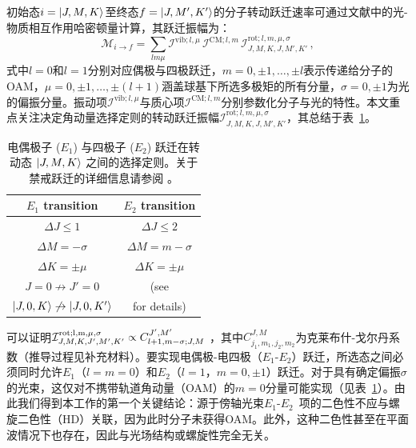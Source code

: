 \documentclass[reprint,aps,prl,twocolumn,superscriptaddress,groupedaddress]{revtex4-2}
\newcommand{\eoet}{$E_1$-$E_2$}
\begin{document}
\begin{CJK*}{UTF8}{gbsn}
初始态$i=\ket{J,M,K}$至终态$f=\ket{J,M',K'}$的分子转动跃迁速率可通过文献\cite{Maslov2024,Maslov_Thesis}中的光-物质相互作用哈密顿量计算，其跃迁振幅为：
\begin{equation}
    \mathcal{M}_{i\to f}=\sum_{lm\mu}\mathcal{I}^{\text{vib}; l,\mu}\,\mathcal{I}^{\text{CM}; l,m}\,\mathcal{I}^{\text{rot}; l,m,\mu,\sigma}_{J,M,K,J,M',K'}\,,
    \label{eq_transition_matrix}
\end{equation}
式中$l=0$和$l=1$分别对应偶极与四极跃迁，$m = 0, \pm 1, \dots, \pm l$表示传递给分子的OAM，$\mu = 0, \pm 1, \dots, \pm (l+1)$涵盖球基下所选多极矩的所有分量，$\sigma =0, \pm 1$为光的偏振分量。振动项$\mathcal{I}^{\text{vib}; l,\mu}$与质心项$\mathcal{I}^{\text{CM}; l,m}$分别参数化分子与光的特性。本文重点关注决定角动量选择定则的转动跃迁振幅$\mathcal{I}^{\text{rot};l,m,\mu,\sigma}_{J,M,K,J,M',K'}$，其总结于表~\ref{SelectionRules}。
\begin{table}[ht!]
    \centering
    \begin{tabular}{c c}\hline
    \toprule
        \textbf{$E_1$ transition} & \textbf{$E_2$ transition}  \\
        \midrule
        $\Delta J\leq 1$ &  $\Delta J\leq 2$ \\
        $\Delta M=-\sigma$ & $\Delta M=m-\sigma$ \\
        $\Delta K=\pm\mu$ & $\Delta K=\pm\mu$ \\
        $J=0\not\to J'=0$ &  (see \cite{Note1}\\
        $\ket{J,0,K}\not\to\ket{J,0,K'}$ &  for details)\\
    \bottomrule
\hline
    \end{tabular}
    \caption{电偶极子 ($E_1$) 与四极子 ($E_2$) 跃迁在转动态 $\ket{J,M,K}$ 之间的选择定则。关于禁戒跃迁的详细信息请参阅 \cite{Note1}。}
    \label{SelectionRules}
\end{table}
可以证明$\mathcal{I}^{\rm rot; l, m, \mu, \sigma}_{J, M, K, J', M', K'} \propto C^{J',M'}_{l+1, m-\sigma; J, M}$ \cite{Maslov2024,Maslov_Thesis}，其中$C^{J, M}_{j_1, m_1, j_2, m_2}$为克莱布什-戈尔丹系数（推导过程见补充材料\cite{Note1}）。要实现电偶极-电四极（\eoet）跃迁，所选态之间必须同时允许$E_1$（$l=m=0$）和$E_2$（$l = 1$，$m = 0, \pm 1$）跃迁。对于具有确定偏振$\sigma$的光束，这仅对不携带轨道角动量（OAM）的$m = 0$分量可能实现（见表~\ref{SelectionRules}）。由此我们得到本工作的第一个关键结论：源于傍轴光束\eoet~项的二色性不应与螺旋二色性（HD）关联，因为此时分子未获得OAM。此外，这种二色性甚至在平面波情况下也存在，因此与光场结构或螺旋性完全无关。


\end{CJK*}
\end{document}
